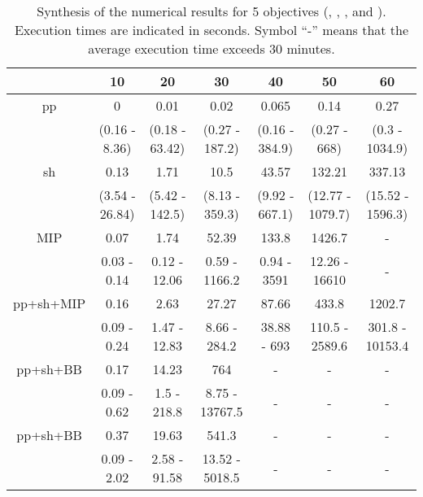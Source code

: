 \documentclass[final,3p,times]{elsarticle}
\begin{document}
\begin{table}[!h]
  \begin{center}
 {\small \begin{tabular}{|c|cccccc|}
   \hline
      \rule[1pt]{0pt}{13pt} 
    & 10&20&30&40&50&60 \\
    \hline
 pp  &0&0.01&0.02&0.065&0.14&0.27\\
    	  &(0.16 - 8.36)&(0.18 - 63.42)&(0.27 - 187.2)&(0.16 - 384.9)&(0.27 - 668)&(0.3 - 1034.9)\\
 sh& 0.13&1.71&10.5&43.57&132.21&337.13\\
    	  &(3.54 - 26.84)&(5.42 - 142.5)&(8.13 - 359.3)&(9.92 - 667.1)&(12.77 - 1079.7)&(15.52 - 1596.3)\\
    \hline
 MIP&0.07&1.74&52.39&133.8&1426.7&-\\
    &0.03 - 0.14&0.12 - 12.06&0.59 - 1166.2&0.94 - 3591&12.26 - 16610& - \\
  pp+sh+MIP &0.16&2.63&27.27&87.66&433.8&1202.7\\
      & 0.09 - 0.24&1.47 - 12.83&8.66 - 284.2&38.88 - 693&110.5 - 2589.6&301.8 - 10153.4\\
  pp+sh+BB& 0.17&14.23&764&-&-&-\\
 & 0.09 - 0.62&1.5 - 218.8&8.75 - 13767.5& - & - & - \\
pp+sh+BB& 0.37&19.63&541.3&-&-&-\\
    &0.09 - 2.02&2.58 - 91.58&13.52 - 5018.5& - & - & - \\
  \hline
       \end{tabular}
}
\end{center}
\caption{\label{tabPL2} Synthesis of the numerical results for 5 objectives (, ,
  ,  and ). Execution times are indicated in seconds. Symbol ``-'' means that the average execution time exceeds 30 minutes.}
\end{table}
\end{document}
